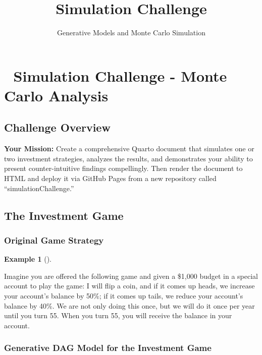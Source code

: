 \documentclass[
  letterpaper,
  DIV=11,
  numbers=noendperiod]{scrartcl}
\title{Simulation Challenge}
\subtitle{Generative Models and Monte Carlo Simulation}
\author{}
\date{}
\theoremstyle{definition}
\newtheorem{example}{Example}[section]
\theoremstyle{remark}
\begin{document}
\maketitle


\section{🎲 Simulation Challenge - Monte Carlo
Analysis}\label{simulation-challenge---monte-carlo-analysis}

\subsection{Challenge Overview}\label{challenge-overview}

\textbf{Your Mission:} Create a comprehensive Quarto document that
simulates one or two investment strategies, analyzes the results, and
demonstrates your ability to present counter-intuitive findings
compellingly. Then render the document to HTML and deploy it via GitHub
Pages from a new repository called ``simulationChallenge.''

\subsection{The Investment Game 🎯}\label{the-investment-game}

\subsubsection{Original Game Strategy}\label{original-game-strategy}

\begin{example}[]\protect\hypertarget{exm-ErgodicityEconomicsExample}{}\label{exm-ErgodicityEconomicsExample}

Imagine you are offered the following game and given a \$1,000 budget in
a special account to play the game: I will flip a coin, and if it comes
up heads, we increase your account's balance by 50\%; if it comes up
tails, we reduce your account's balance by 40\%. We are not only doing
this once, but we will do it once per year until you turn 55. When you
turn 55, you will receive the balance in your account.

\end{example}

\subsubsection{Generative DAG Model for the Investment
Game}\label{generative-dag-model-for-the-investment-game}
\end{document}
